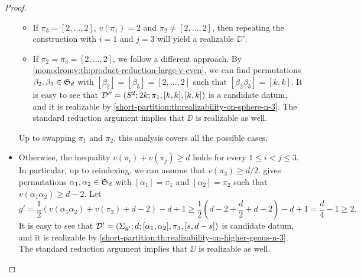\begin{proof}
\begin{itemize}
\begin{itemize}
\item If $\pi_3=[2,\ldots,2]$, $v(\pi_1)=2$ and $\pi_2\neq [2,\ldots,2]$, then repeating the construction with $i=1$ and $j=3$ will yield a realizable $\DD'$.
\item If $\pi_2=\pi_3=[2,\ldots,2]$, we follow a different approach. By \cref{monodromy:th:product-reduction-large-v-even}, we can find permutations $\beta_2,\beta_3\in\symgroup[d]$ with $[\beta_2]=[\beta_3]=[2,\ldots,2]$ such that $[\beta_2\beta_3]=[k,k]$. It is easy to see that $\mathcal{D}''=(S^2{};2k;\pi_1,[k,k],[k,k])$ is a candidate datum, and it is realizable by \cref{short-partition:th:realizability-on-sphere-n-3}. The standard reduction argument implies that $\DD$ is realizable as well.
\end{itemize}

Up to swapping $\pi_1$ and $\pi_2$, this analysis covers all the possible cases.
\item Otherwise, the inequality $v(\pi_i)+v(\pi_j)\ge d$ holds for every $1\le i<j\le 3$. In particular, up to reindexing, we can assume that $v(\pi_3)\ge d/2$.  gives permutations $\alpha_1,\alpha_2\in\symgroup[d]$ with $[\alpha_1]=\pi_1$ and $[\alpha_2]=\pi_2$ such that $v(\alpha_1\alpha_2)\ge d-2$. Let
\[
g'=\frac{1}{2}(v(\alpha_1\alpha_2)+v(\pi_3)+d-2)-d+1\ge\frac{1}{2}\left(d-2+\frac{d}{2}+d-2\right)-d+1=\frac{d}{4}-1\ge 2.
\]
It is easy to see that $\mathcal{D}'=(\Sigma_{g'};d;[\alpha_1,\alpha_2],\pi_3,[s,d-s])$ is candidate datum, and it is realizable by \cref{short-partition:th:realizability-on-higher-genus-n-3}. The standard reduction argument implies that $\DD$ is realizable as well.
\end{itemize}


\end{proof}
